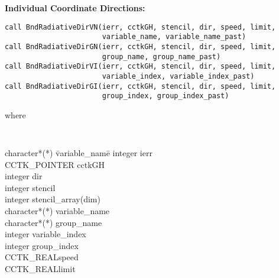 \documentclass{article}
\begin{document}
\noindent
{\bf Individual Coordinate Directions:}
\begin{verbatim}
call BndRadiativeDirVN(ierr, cctkGH, stencil, dir, speed, limit, 
                       variable_name, variable_name_past)
call BndRadiativeDirGN(ierr, cctkGH, stencil, dir, speed, limit, 
                       group_name, group_name_past)
call BndRadiativeDirVI(ierr, cctkGH, stencil, dir, speed, limit, 
                       variable_index, variable_index_past)
call BndRadiativeDirGI(ierr, cctkGH, stencil, dir, speed, limit, 
                       group_index, group_index_past)
\end{verbatim}
where
{\tt
\begin{tabbing}
character*(*) \= variable\_name\=\kill
integer \> ierr \\
CCTK\_POINTER \> cctkGH\\
integer \> dir\\
integer \> stencil\\
integer \> stencil\_array(dim)\\
character*(*) \> variable\_name\\
character*(*) \> group\_name\\
integer \> variable\_index\\
integer \> group\_index\\
CCTK\_REAL\>speed\\
CCTK\_REAL\>limit\\
\end{tabbing}
}
\end{document}
